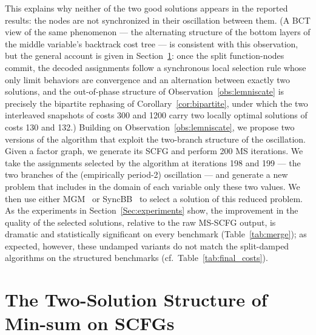 \documentclass[letterpaper]{article} %
\theoremstyle{definition}
\theoremstyle{remark}
\begin{document}
\noindent This explains why neither of the two good solutions appears in the reported results: the nodes are not synchronized in their oscillation between them. (A BCT view of the same phenomenon --- the alternating structure of the bottom layers of the middle variable's backtrack cost tree --- is consistent with this observation, but the general account is given in Section~\ref{sec:tworoutes}: once the split function-nodes commit, the decoded assignments follow a synchronous local selection rule whose only limit behaviors are convergence and an alternation between exactly two solutions, and the out-of-phase structure of Observation~\ref{obs:lemniscate} is precisely the bipartite rephasing of Corollary~\ref{cor:bipartite}, under which the two interleaved snapshots of costs 300 and 1200 carry two locally optimal solutions of costs 130 and 132.)
Building on Observation~\ref{obs:lemniscate}, we propose two versions of the algorithm that exploit the two-branch structure of the oscillation. Given a factor graph, we generate its SCFG and perform 200 MS iterations. We take the assignments selected by the algorithm at iterations 198 and 199 --- the two branches of the (empirically period-2) oscillation --- and generate a new problem that includes in the domain of each variable only these two values. We then use either MGM~\cite{MaheswaranTBPV04} or SyncBB~\cite{HirayamaY97} to select a solution of this reduced problem. As the experiments in Section~\ref{Sec:experiments} show, the improvement in the quality of the selected solutions, relative to the raw MS-SCFG output, is dramatic and statistically significant on every benchmark (Table~\ref{tab:merge}); as expected, however, these undamped variants do not match the split-damped algorithms on the structured benchmarks (cf.\ Table~\ref{tab:final_costs}).


\section{The Two-Solution Structure of Min-sum on SCFGs}\label{sec:tworoutes}
\end{document}
